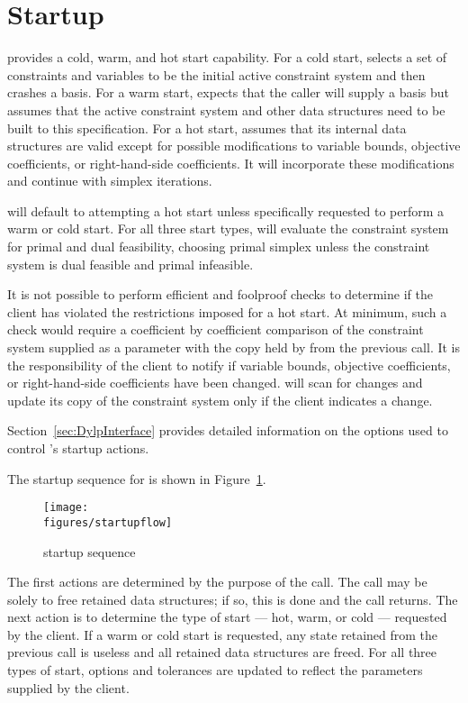 \section{Startup}
\label{sec:Startup}

\dylp provides a cold, warm, and hot start capability.
For a cold start, \dylp selects a set of constraints and variables to be the
initial active constraint system and then crashes a basis.
For a warm start, \dylp expects that the caller will supply a basis but assumes
that the active constraint system and other data structures need to be built
to this specification.
For a hot start, \dylp assumes that its internal data structures are valid
except for possible modifications to variable bounds, objective coefficients,
or right-hand-side coefficients.
It will incorporate these modifications and continue with simplex iterations.

\dylp will default to attempting a hot start unless specifically requested
to perform a warm or cold start.
For all three start types, \dylp will evaluate the constraint system for
primal and dual
feasibility, choosing primal simplex unless the constraint system is
dual feasible and primal infeasible.

It is not possible to perform efficient and foolproof checks to
determine if the client has violated the restrictions imposed for a hot start.
At minimum, such a check would require a coefficient by coefficient comparison
of the constraint system supplied as a parameter with the copy held by \dylp
from the previous call.
It is the responsibility of the client to notify \dylp if variable bounds,
objective coefficients, or right-hand-side coefficients have been changed.
\dylp will scan for changes and update its copy of the constraint system
only if the client indicates a change.

Section~\ref{sec:DylpInterface} provides detailed information on the options
used to control \dylp's startup actions.

The startup sequence for \dylp is shown in Figure~\ref{fig:DylpStartupFlow}.
\begin{figure}
\texttt{[image: \\figures/startupflow]}
\caption{\dylp startup sequence} \label{fig:DylpStartupFlow}
\end{figure}
The first actions are determined by the purpose of the call.
The call may be solely to free retained data structures; if so, this is
done and the call returns.
The next action is to determine the type of start --- hot, warm,
or cold --- requested by the client.
If a warm or cold start is requested, any state retained from the previous
call is useless and all retained data structures are freed.
For all three types of start, options and tolerances are updated to reflect
the parameters supplied by the client.

